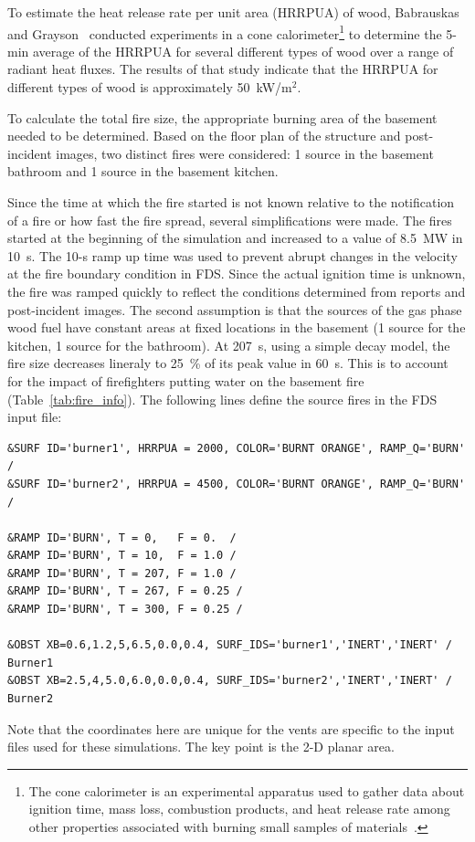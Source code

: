 \documentclass[12pt,oneside]{book}
\begin{document}
To estimate the heat release rate per unit area (HRRPUA) of wood, Babrauskas and Grayson~\cite{babrauskas1990} conducted experiments in a cone calorimeter\footnote{The cone calorimeter is an experimental apparatus used to gather data about ignition time, mass loss, combustion products, and heat release rate among other properties associated with burning small samples of materials~\cite{ASTM:E1355}.} to determine the 5-min average of the HRRPUA for several different types of wood over a range of radiant heat fluxes. The results of that study indicate that the HRRPUA for different types of wood is approximately 50~kW/m$^2$.

To calculate the total fire size, the appropriate burning area of the basement needed to be determined. Based on the floor plan of the structure and post-incident images, two distinct fires were considered: 1 source in the basement bathroom and 1 source in the basement kitchen. 

Since the time at which the fire started is not known relative to the notification of a fire or how fast the fire spread, several simplifications were made. The fires started at the beginning of the simulation and increased to a value of 8.5~MW in 10~s. The 10-s ramp up time was used to prevent abrupt changes in the velocity at the fire boundary condition in FDS. Since the actual ignition time is unknown, the fire was ramped quickly to reflect the conditions determined from reports and post-incident images. The second assumption is that the sources of the gas phase wood fuel have constant areas at fixed locations in the basement (1 source for the kitchen, 1 source for the bathroom).  At 207~s, using a simple decay model, the fire size decreases lineraly to 25~\% of its peak value in 60~s. This is to account for the impact of firefighters putting water on the basement fire (Table~\ref{tab:fire_info}). The following lines define the source fires in the FDS input file:

\begin{lstlisting}
&SURF ID='burner1', HRRPUA = 2000, COLOR='BURNT ORANGE', RAMP_Q='BURN' /
&SURF ID='burner2', HRRPUA = 4500, COLOR='BURNT ORANGE', RAMP_Q='BURN' /

&RAMP ID='BURN', T = 0,   F = 0.  /
&RAMP ID='BURN', T = 10,  F = 1.0 /
&RAMP ID='BURN', T = 207, F = 1.0 /
&RAMP ID='BURN', T = 267, F = 0.25 /
&RAMP ID='BURN', T = 300, F = 0.25 /

&OBST XB=0.6,1.2,5,6.5,0.0,0.4, SURF_IDS='burner1','INERT','INERT' /  Burner1
&OBST XB=2.5,4,5.0,6.0,0.0,0.4, SURF_IDS='burner2','INERT','INERT' /  Burner2
\end{lstlisting}
Note that the coordinates here are unique for the vents are specific to the input files used for these simulations. The key point is the 2-D planar area. 
\end{document}
